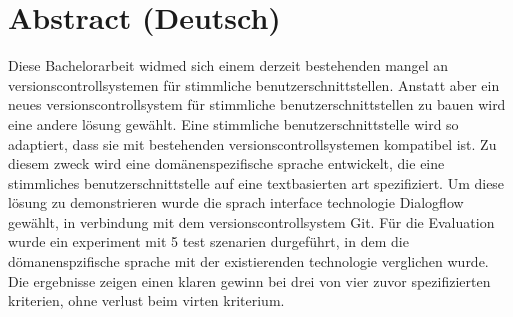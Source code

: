 \chapter{Abstract (Deutsch)}

Diese Bachelorarbeit widmed sich einem derzeit bestehenden mangel an versionscontrollsystemen  für stimmliche benutzerschnittstellen.
Anstatt aber ein neues versionscontrollsystem für stimmliche benutzerschnittstellen zu bauen wird eine andere lösung gewählt. 
Eine stimmliche benutzerschnittstelle wird so adaptiert, dass sie mit bestehenden versionscontrollsystemen kompatibel ist.
Zu diesem  zweck wird eine domänenspezifische sprache entwickelt, die eine stimmliches benutzerschnittstelle auf eine textbasierten art spezifiziert. 
Um diese lösung zu demonstrieren wurde die sprach interface technologie Dialogflow gewählt, in verbindung mit dem versionscontrollsystem Git.
Für die Evaluation wurde ein experiment mit 5 test szenarien durgeführt, in dem die dömanenspzifische sprache mit der existierenden technologie verglichen wurde. Die ergebnisse zeigen einen klaren gewinn bei drei von vier zuvor spezifizierten kriterien, ohne verlust beim virten kriterium.
